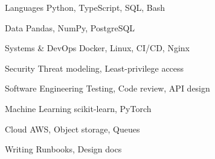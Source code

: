 

\begin{cvskills}

  \cvskill
    {Languages}
    {Python, TypeScript, SQL, Bash}

  \cvskill
    {Data}
    {Pandas, NumPy, PostgreSQL}

  \cvskill
    {Systems \& DevOps}
    {Docker, Linux, CI/CD, Nginx}

  \cvskill
    {Security}
    {Threat modeling, Least-privilege access}

  \cvskill
    {Software Engineering}
    {Testing, Code review, API design}

  \cvskill
    {Machine Learning}
    {scikit-learn, PyTorch}

  \cvskill
    {Cloud}
    {AWS, Object storage, Queues}

  \cvskill
    {Writing}
    {Runbooks, Design docs}

\end{cvskills}
